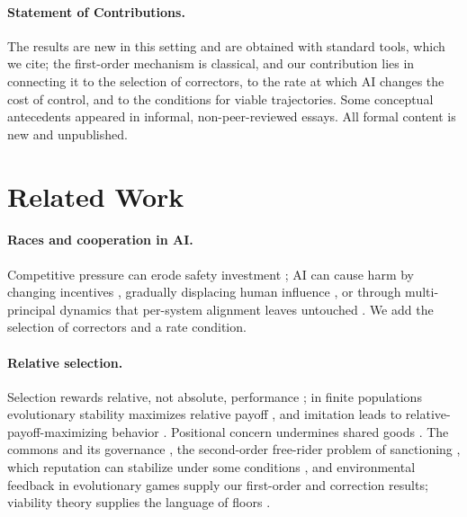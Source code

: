 \documentclass[letterpaper]{article} %
\theoremstyle{definition}
\begin{document}
\paragraph{Statement of Contributions.} The results are new in this setting and are obtained with standard tools, which we cite; the first-order mechanism is classical, and our contribution lies in connecting it to the selection of correctors, to the rate at which AI changes the cost of control, and to the conditions for viable trajectories. Some conceptual antecedents appeared in informal, non-peer-reviewed essays. All formal content is new and unpublished.

\section{Related Work}\label{sec:related}

\paragraph{Races and cooperation in AI.} Competitive pressure can erode safety investment \citep{armstrong2016,askell2019,dafoe2020}; AI can cause harm by changing incentives \citep{zwetsloot2019}, gradually displacing human influence \citep{christiano2019,kulveit2025}, or through multi-principal dynamics that per-system alignment leaves untouched \citep{critch2020,critch2021,hendrycks2023,hammond2025}. We add the selection of correctors and a rate condition.

\paragraph{Relative selection.} Selection rewards relative, not absolute, performance \citep{alchian1950}; in finite populations evolutionary stability maximizes relative payoff \citep{schaffer1988}, and imitation leads to relative-payoff-maximizing behavior \citep{vegaredondo1997}. Positional concern undermines shared goods \citep{hirsch1976,frank1985}. The commons and its governance \citep{hardin1968,olson1965,ostrom1990}, the second-order free-rider problem of sanctioning \citep{oliver1980,yamagishi1986,heckathorn1989}, which reputation can stabilize under some conditions \citep{panchanathan2004}, and environmental feedback in evolutionary games \citep{weitz2016,tilman2020} supply our first-order and correction results; viability theory supplies the language of floors \citep{aubin1991,rockstrom2009}.
\end{document}
